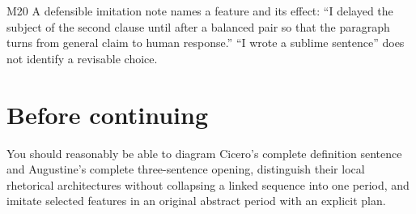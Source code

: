 \begin{courseunit}{M20}
A defensible imitation note names a feature and its effect: ``I delayed the
subject of the second clause until after a balanced pair so that the paragraph
turns from general claim to human response.''  ``I wrote a sublime sentence''
does not identify a revisable choice.
\else
\section{Before continuing}
You should reasonably be able to diagram Cicero's complete definition sentence
and Augustine's complete three-sentence opening, distinguish their local
rhetorical architectures without collapsing a linked sequence into one
period, and imitate selected features in an original abstract period with an
explicit plan.
\fi
\end{courseunit}

